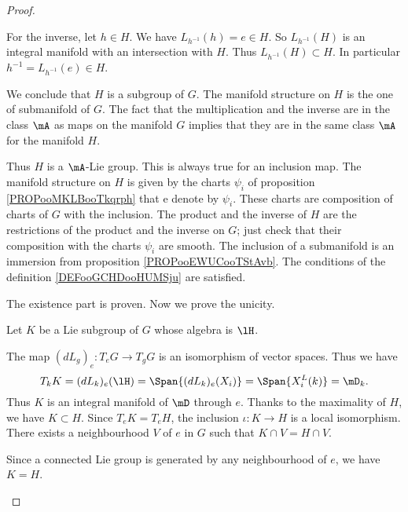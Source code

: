 \begin{proof}
\begin{subproof}
		For the inverse, let \( h\in H\). We have \( L_{h^{-1}}(h)=e\in H\). So \( L_{h^{-1}}(H)\) is an integral manifold with an intersection with \( H\). Thus \( L_{h^{-1}}(H)\subset H\). In particular \( h^{-1}=L_{h^{-1}}(e)\in H\).

		We conclude that \( H\) is a subgroup of \( G\).
		The manifold structure on \( H\) is the one of submanifold of \( G\). The fact that the multiplication and the inverse are in the class \( \mA\) as maps on the manifold \( G\) implies that they are in the same class \( \mA\) for the manifold \( H\).

		Thus \( H\) is a \( \mA\)-Lie group.
		This is always true for an inclusion map.
		The manifold structure on \( H\) is given by the charts \( \psi_i\) of proposition \ref{PROPooMKLBooTkqrph} that e denote by \( \psi_i\). These charts are composition of charts of \( G\) with the inclusion. The product and the inverse of \( H\) are the restrictions of the product and the inverse on \( G\); just check that their composition with the charts \( \psi_i\) are smooth.
		The inclusion of a submanifold is an immersion from proposition \ref{PROPooEWUCooTStAvb}.
		The conditions of the definition \ref{DEFooGCHDooHUMSju} are satisfied.
	\end{subproof}
	The existence part is proven. Now we prove the unicity.

	Let \( K\) be a Lie subgroup of \( G\) whose algebra is \( \lH\).
	\begin{subproof}
		\spitem[\( T_kK=\mD_k\)]
		The map \( (dL_g)_e\colon T_eG\to T_gG\) is an isomorphism of vector spaces. Thus we have
		\begin{equation}
			T_kK=(dL_k)_e(\lH)=\Span\{ (dL_k)_e(X_i) \}=\Span\{ X_i^L(k) \}=\mD_k.
		\end{equation}
		\spitem[Maximality]
		Thus \( K\) is an integral manifold of \( \mD\) through \( e\). Thanks to the maximality of \( H\), we have \( K\subset H\). Since \( T_eK=T_eH\), the inclusion \( \iota\colon K\to H\) is a local isomorphism. There exists a neighbourhood \( V\) of \( e\) in \( G\) such that \( K\cap V=H\cap V\).

		Since a connected Lie group is generated by any neighbourhood of \( e\), we have \( K=H\).
	\end{subproof}
\end{proof}


